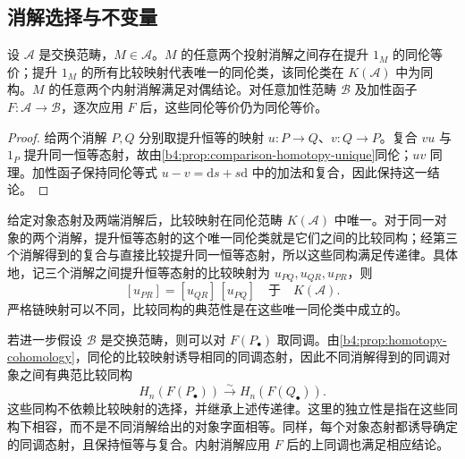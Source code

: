 \subsection{消解选择与不变量}
\label{b4:subsec:0702:03}

\begin{corollary}\label{b4:cor:resolutions-homotopy-equivalent}
	设 \(\mathcal A\) 是交换范畴，\(M\in\mathcal A\)。\(M\) 的任意两个投射消解之间存在提升 \(1_M\) 的同伦等价；提升 \(1_M\) 的所有比较映射代表唯一的同伦类，该同伦类在 \(K(\mathcal A)\) 中为同构。\(M\) 的任意两个内射消解满足对偶结论。对任意加性范畴 \(\mathcal B\) 及加性函子 \(F:\mathcal A\to\mathcal B\)，逐次应用 \(F\) 后，这些同伦等价仍为同伦等价。
\end{corollary}
\begin{proof}
	给两个消解 \(P,Q\) 分别取提升恒等的映射 \(u:P\to Q\)、\(v:Q\to P\)。复合 \(vu\) 与 \(1_P\) 提升同一恒等态射，故由\cref{b4:prop:comparison-homotopy-unique}同伦；\(uv\) 同理。加性函子保持同伦等式 \(u-v=\mathrm{d}s+s\mathrm{d}\) 中的加法和复合，因此保持这一结论。
\end{proof}

给定对象态射及两端消解后，比较映射在同伦范畴 \(K(\mathcal A)\) 中唯一。对于同一对象的两个消解，提升恒等态射的这个唯一同伦类就是它们之间的比较同构；经第三个消解得到的复合与直接比较提升同一恒等态射，所以这些同构满足传递律。具体地，记三个消解之间提升恒等态射的比较映射为 \(u_{PQ},u_{QR},u_{PR}\)，则
\[
	[u_{PR}]=[u_{QR}]\,[u_{PQ}] \quad\text{于}\quad K(\mathcal A).
\]
严格链映射可以不同，比较同构的典范性是在这些唯一同伦类中成立的。

\ProseParagraphBreak
若进一步假设 \(\mathcal B\) 是交换范畴，则可以对 \(F(P_\bullet)\) 取同调。由\cref{b4:prop:homotopy-cohomology}，同伦的比较映射诱导相同的同调态射，因此不同消解得到的同调对象之间有典范比较同构
\[
	H_n(F(P_\bullet))\xrightarrow{\sim}H_n(F(Q_\bullet)).
\]
这些同构不依赖比较映射的选择，并继承上述传递律。这里的独立性是指在这些同构下相容，而不是不同消解给出的对象字面相等。同样，每个对象态射都诱导确定的同调态射，且保持恒等与复合。内射消解应用 \(F\) 后的上同调也满足相应结论。
